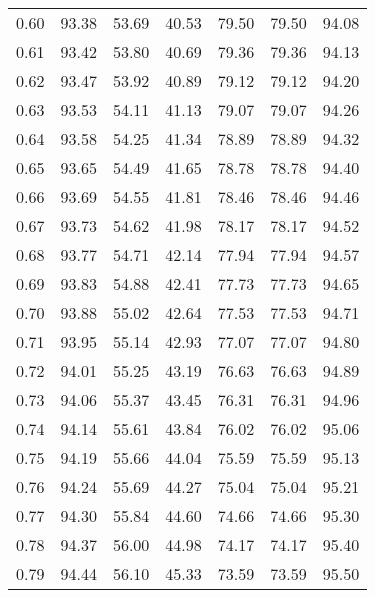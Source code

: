 \begin{tabular}{|c|c|c|c|c|c|c|}
      0.60 &     93.38 &     53.69 &      40.53 &   79.50 &      79.50 &         94.08 \\
      0.61 &     93.42 &     53.80 &      40.69 &   79.36 &      79.36 &         94.13 \\
      0.62 &     93.47 &     53.92 &      40.89 &   79.12 &      79.12 &         94.20 \\
      0.63 &     93.53 &     54.11 &      41.13 &   79.07 &      79.07 &         94.26 \\
      0.64 &     93.58 &     54.25 &      41.34 &   78.89 &      78.89 &         94.32 \\
      0.65 &     93.65 &     54.49 &      41.65 &   78.78 &      78.78 &         94.40 \\
      0.66 &     93.69 &     54.55 &      41.81 &   78.46 &      78.46 &         94.46 \\
      0.67 &     93.73 &     54.62 &      41.98 &   78.17 &      78.17 &         94.52 \\
      0.68 &     93.77 &     54.71 &      42.14 &   77.94 &      77.94 &         94.57 \\
      0.69 &     93.83 &     54.88 &      42.41 &   77.73 &      77.73 &         94.65 \\
      0.70 &     93.88 &     55.02 &      42.64 &   77.53 &      77.53 &         94.71 \\
      0.71 &     93.95 &     55.14 &      42.93 &   77.07 &      77.07 &         94.80 \\
      0.72 &     94.01 &     55.25 &      43.19 &   76.63 &      76.63 &         94.89 \\
      0.73 &     94.06 &     55.37 &      43.45 &   76.31 &      76.31 &         94.96 \\
      0.74 &     94.14 &     55.61 &      43.84 &   76.02 &      76.02 &         95.06 \\
      0.75 &     94.19 &     55.66 &      44.04 &   75.59 &      75.59 &         95.13 \\
      0.76 &     94.24 &     55.69 &      44.27 &   75.04 &      75.04 &         95.21 \\
      0.77 &     94.30 &     55.84 &      44.60 &   74.66 &      74.66 &         95.30 \\
      0.78 &     94.37 &     56.00 &      44.98 &   74.17 &      74.17 &         95.40 \\
      0.79 &     94.44 &     56.10 &      45.33 &   73.59 &      73.59 &         95.50 \\

\end{tabular}
